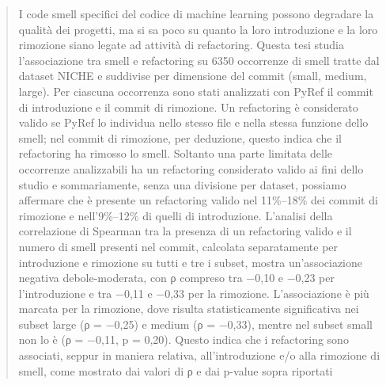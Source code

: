\begin{titlepage}
\begin{abstract}
%
I code smell specifici del codice di machine learning possono degradare la qualità dei progetti, ma si sa poco su quanto la loro introduzione e la loro rimozione siano legate ad attività di refactoring. Questa tesi studia l'associazione tra smell e refactoring su 6350 occorrenze di smell tratte dal dataset NICHE e suddivise per dimensione del commit (small, medium, large). Per ciascuna occorrenza sono stati analizzati con PyRef il commit di introduzione e il commit di rimozione. Un refactoring è considerato valido se PyRef lo individua nello stesso file e nella stessa funzione dello smell; nel commit di rimozione, per deduzione, questo indica che il refactoring ha rimosso lo smell.
Soltanto una parte limitata delle occorrenze analizzabili ha un refactoring considerato valido ai fini dello studio e sommariamente, senza una divisione per dataset, possiamo affermare che è presente un  refactoring valido nel 11\%–18\% dei commit di rimozione e nell’9\%–12\% di quelli di introduzione. L’analisi della correlazione di Spearman tra la presenza di un refactoring valido e il numero di smell presenti nel commit, calcolata separatamente per introduzione e rimozione su tutti e tre i subset, mostra un’associazione negativa debole-moderata, con ρ compreso tra −0,10 e −0,23 per l’introduzione e tra −0,11 e −0,33 per la rimozione. L’associazione è più marcata per la rimozione, dove risulta statisticamente significativa nei subset large (ρ = −0,25) e medium (ρ = −0,33), mentre nel subset small non lo è (ρ = −0,11, p = 0,20). Questo indica che i refactoring sono associati, seppur in maniera relativa, all’introduzione e/o alla rimozione di smell, come mostrato dai valori di ρ e dai p-value sopra riportati
%
\\[1cm]
\end{abstract}
\end{titlepage}